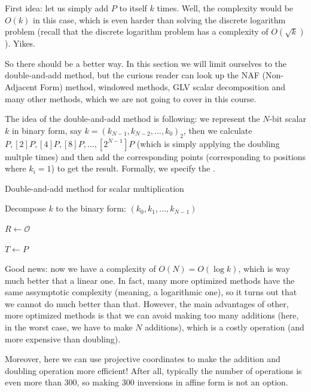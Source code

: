 \documentclass[../lecture-notes-148x210.tex]{subfiles}
\begin{document}
First idea: let us simply add $P$ to itself $k$ times. Well, the complexity would be $O(k)$ in this case, which is even harder than solving the discrete logarithm problem (recall that the discrete logarithm problem has a complexity of $O(\sqrt{k})$). Yikes.

So there should be a better way. In this section we will limit ourselves to the double-and-add method, but the curious reader can look up the NAF (Non-Adjacent Form) method, windowed methods, GLV scalar decomposition and many other methods, which we are not going to cover in this course.

The idea of the double-and-add method is following: we represent the $N$-bit scalar $k$ in binary form, say $k = (k_{N-1},k_{N-2},\dots,k_0)_2$, then we calculate $P, [2]P, [4]P, [8]P, \dots, [2^{N-1}]P$ (which is simply applying the doubling multple times) and then add the corresponding points (corresponding to positions where $k_i=1$) to get the result. Formally, we specify the .

\begin{algorithm}
    \caption{Double-and-add method for scalar multiplication}\label{alg:double_and_add}
    
    Decompose $k$ to the binary form: $(k_0,k_1,\dots,k_{N-1})$
    
    $R \gets \mathcal{O}$
    
    $T \gets P$
    
    
\end{algorithm}    

Good news: now we have a complexity of $O(N)=O(\log k)$, which is way much better that a linear one. In fact, many more optimized methods have the same assymptotic complexity (meaning, a logarithmic one), so it turns out that 
we cannot do much better than that. However, the main advantages of other, more optimized methods is that we can avoid making too many additions (here, in the worst case, we have to make $N$ additions), which is a costly operation (and more expensive than doubling).

Moreover, here we can use projective coordinates to make the addition and doubling operation more efficient! After all, typically the number of operations is even more than $300$, so making $300$ inversions in affine form is not an option.
\end{document}
